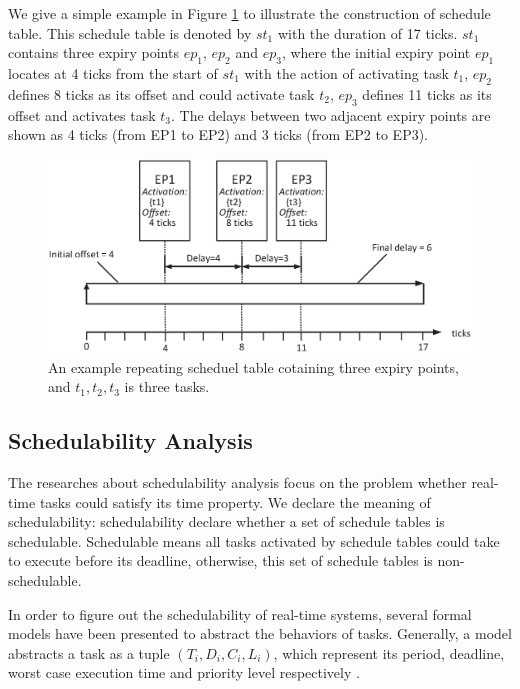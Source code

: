 \documentclass[sigconf]{acmart}
\begin{document}
We give a simple example in Figure \ref{figure_st1} to illustrate the construction of schedule table. This schedule table is denoted by $st_1$ with the duration of 17 ticks. $st_1$ contains three expiry points $ep_1$, $ep_2$ and $ep_3$, where the initial expiry point $ep_1$ locates at 4 ticks from the start of $st_1$ with the action of activating task $t_1$, $ep_2$ defines 8 ticks as its offset and could activate task $t_2$, $ep_3$ defines 11 ticks as its offset and activates task $t_3$. The delays between two adjacent expiry points are shown as 4 ticks (from EP1 to EP2) and 3 ticks (from EP2 to EP3).
\begin{figure}[t]
  \centering
  \includegraphics[scale=.32]{graphics/figure_st1.eps}
  \caption{An example repeating scheduel table cotaining three expiry points, and $t_1,t_2,t_3$ is three tasks.}
  \label{figure_st1}
\end{figure}
\subsection{Schedulability Analysis}
The researches about schedulability analysis focus on the problem whether real-time tasks could satisfy its time property. We declare the meaning of schedulability: schedulability declare whether a set of schedule tables is schedulable. Schedulable means all tasks activated by schedule tables could take to execute before its deadline, otherwise, this set of schedule tables is non-schedulable.

In order to figure out the schedulability of real-time systems, several formal models have been presented to abstract the behaviors of tasks. Generally, a model abstracts a task as a tuple $(T_i,D_i,C_i,L_i)$, which represent its period, deadline, worst case execution time and priority level respectively \cite{DBLP:journals/csur/BurnsD17}. 
\end{document}
